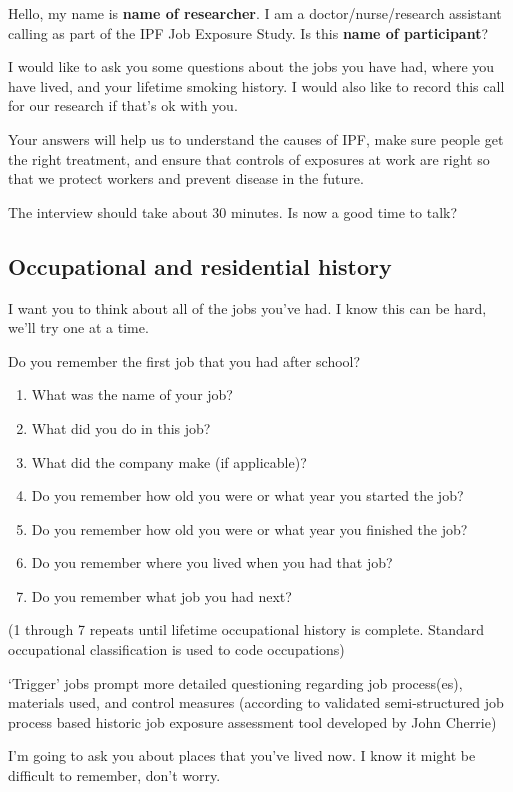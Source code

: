 \documentclass[a4paper,10pt]{article}
\begin{document}
Hello, my name is \textbf{name of researcher}. I am a doctor/nurse/research assistant calling as part of the IPF Job Exposure Study. Is this \textbf{name of participant}? 

I would like to ask you some questions about the jobs you have had, where you have lived, and your lifetime smoking history. I would also like to record this call for our research if that's ok with you.  

Your answers will help us to understand the causes of IPF, make sure people get the right treatment, and ensure that controls of exposures at work are right so that we protect workers and prevent disease in the future.  

The interview should take about 30 minutes. Is now a good time to talk?

\subsection{Occupational and residential history} 

I want you to think about all of the jobs you've had. I know this can be hard, we'll try one at a time. 

Do you remember the first job that you had after school?

\begin{enumerate}
\item  What was the name of your job?
\item  What did you do in this job?
\item  What did the company make (if applicable)?
\item  Do you remember how old you were or what year you started the job?
\item  Do you remember how old you were or what year you finished the job?
\item  Do you remember where you lived when you had that job?
\item  Do you remember what job you had next?
\end{enumerate}

(1 through 7 repeats until lifetime occupational history is complete. Standard occupational classification is used to code occupations)

`Trigger' jobs prompt more detailed questioning regarding job process(es), materials used, and control measures (according to validated semi-structured job process based historic job exposure assessment tool developed by John Cherrie)

I'm going to ask you about places that you've lived now. I know it might be difficult to remember, don't worry. 
\end{document}
